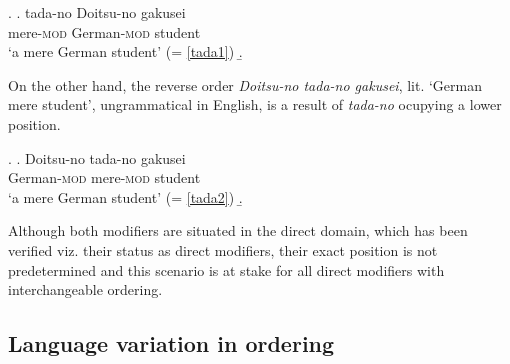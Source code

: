 \documentclass [output=book,colorlinks,citecolor=brown]{langscibook}
\begin{document}

\ex. \ag. tada-no Doitsu-no gakusei\\
mere-\textsc{mod} German-\textsc{mod} student\\
`a mere German student' (= \ref{tada1})
\b. 

On the other hand, the reverse order \textit{Doitsu-no tada-no gakusei}, lit. `German mere student', ungrammatical in English, is a result of \textit{tada-no} ocupying a lower position.

\newpage

\ex. \ag. Doitsu-no tada-no gakusei\\
German-\textsc{mod} mere-\textsc{mod} student\\
`a mere German student' (= \ref{tada2})
\b. 

Although both modifiers are situated in the direct domain, which has been verified viz. their status as direct modifiers, their exact position is not predetermined and this scenario is at stake for all direct modifiers with interchangeable ordering.

\subsection{Language variation in ordering} \label{language variation}
\end{document}
